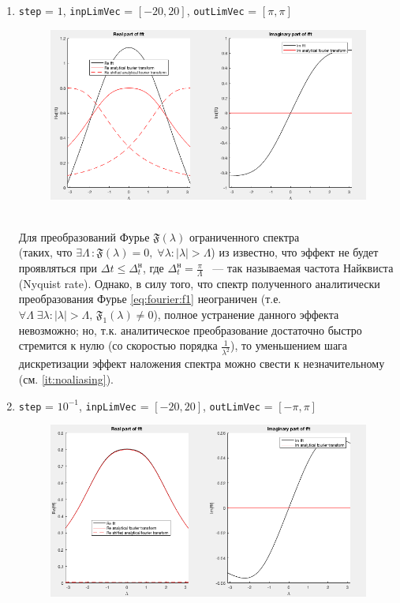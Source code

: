 \documentclass[11pt, oneside, final]{article}
\numberwithin{equation}{section}
\newcounter{icount}
\newcommand \four[1][\lambda]{\mathfrak{F}(#1)}
\begin{document}
    \begin{enumerate}
        \setcounter{enumi}{\value{icount}}
        \item 
        \texttt{step} = \(1\), \texttt{inpLimVec} = \( [-20, 20] \), \texttt{outLimVec} = \( [\pi, \pi] \)
        \begin{figure}[!h]
            \centering
            \includegraphics[width=\linewidth]{f1fig4}
            \label{pic:f1:4}
        \end{figure} \\
        Для преобразований Фурье \( \four \) ограниченного спектра \\ (таких, что \( \exists\Lambda \, \colon \four =0, \; \forall \lambda \colon |\lambda| > \Lambda \))
        из \cite{Roublev:fourier} известно, что эффект не будет проявляться при \(\Delta t \leqslant \Delta_{t}^\text{н}\),
        где \(\Delta_{t}^\text{н} = \frac{\pi}{\Lambda}\) ~--- так называемая частота Найквиста (Nyquist rate).
        Однако, в силу того, что спектр полученного аналитически преобразования Фурье \eqref{eq:fourier:f1} 
        неограничен (т.е. \(\forall \Lambda \; \exists \lambda \colon |\lambda| > \Lambda, \, \mathfrak{F_1}(\lambda) \not = 0 \)),
        полное устранение данного эффекта невозможно;
        но, т.к. аналитическое преобразование достаточно быстро стремится к нулю (со скоростью порядка \(\frac{1}{\lambda^2}\)), 
        то уменьшением шага дискретизации эффект наложения спектра можно свести к незначительному (см. \ref{it:noaliasing}).
        \clearpage
        \item
        \label{it:noaliasing}
        \texttt{step} = \(10^{-1}\), \texttt{inpLimVec} = \( [-20, 20] \), \texttt{outLimVec} = \( [-\pi, \pi] \)
        \begin{figure}[!h]
            \centering
            \includegraphics[width=\linewidth]{f1fig5}

\end{figure}
\end{enumerate}
\end{document}
